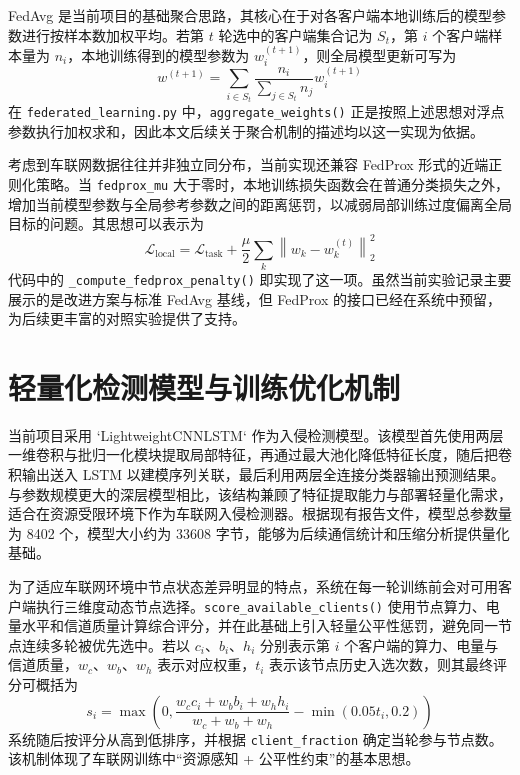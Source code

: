 FedAvg 是当前项目的基础聚合思路，其核心在于对各客户端本地训练后的模型参数进行按样本数加权平均。若第 $t$ 轮选中的客户端集合记为 $S_t$，第 $i$ 个客户端样本量为 $n_i$，本地训练得到的模型参数为 $w_i^{(t+1)}$，则全局模型更新可写为
\begin{equation}
    \label{eq:fedavg}
    w^{(t+1)} = \sum_{i \in S_t} \frac{n_i}{\sum_{j \in S_t} n_j} w_i^{(t+1)}
\end{equation}
在 \texttt{federated\_learning.py} 中，\texttt{aggregate\_weights()} 正是按照上述思想对浮点参数执行加权求和，因此本文后续关于聚合机制的描述均以这一实现为依据。

考虑到车联网数据往往并非独立同分布，当前实现还兼容 FedProx 形式的近端正则化策略。当 \texttt{fedprox\_mu} 大于零时，本地训练损失函数会在普通分类损失之外，增加当前模型参数与全局参考参数之间的距离惩罚，以减弱局部训练过度偏离全局目标的问题。其思想可以表示为
\begin{equation}
    \label{eq:fedprox}
    \mathcal{L}_{\text{local}} = \mathcal{L}_{\text{task}} + \frac{\mu}{2} \sum_k \left\| w_k - w_k^{(t)} \right\|_2^2
\end{equation}
代码中的 \texttt{\_compute\_fedprox\_penalty()} 即实现了这一项。虽然当前实验记录主要展示的是改进方案与标准 FedAvg 基线，但 FedProx 的接口已经在系统中预留，为后续更丰富的对照实验提供了支持。

\section{轻量化检测模型与训练优化机制}
\label{sec:related-model-optimization}

当前项目采用 `LightweightCNNLSTM` 作为入侵检测模型。该模型首先使用两层一维卷积与批归一化模块提取局部特征，再通过最大池化降低特征长度，随后把卷积输出送入 LSTM 以建模序列关联，最后利用两层全连接分类器输出预测结果。与参数规模更大的深层模型相比，该结构兼顾了特征提取能力与部署轻量化需求，适合在资源受限环境下作为车联网入侵检测器。根据现有报告文件，模型总参数量为 8402 个，模型大小约为 33608 字节，能够为后续通信统计和压缩分析提供量化基础。

为了适应车联网环境中节点状态差异明显的特点，系统在每一轮训练前会对可用客户端执行三维度动态节点选择。\texttt{score\_available\_clients()} 使用节点算力、电量水平和信道质量计算综合评分，并在此基础上引入轻量公平性惩罚，避免同一节点连续多轮被优先选中。若以 $c_i$、$b_i$、$h_i$ 分别表示第 $i$ 个客户端的算力、电量与信道质量，$w_c$、$w_b$、$w_h$ 表示对应权重，$t_i$ 表示该节点历史入选次数，则其最终评分可概括为
\begin{equation}
    \label{eq:client-selection}
    s_i = \max \left(0, \frac{w_c c_i + w_b b_i + w_h h_i}{w_c + w_b + w_h} - \min(0.05 t_i, 0.2) \right)
\end{equation}
系统随后按评分从高到低排序，并根据 \texttt{client\_fraction} 确定当轮参与节点数。该机制体现了车联网训练中“资源感知 + 公平性约束”的基本思想。

